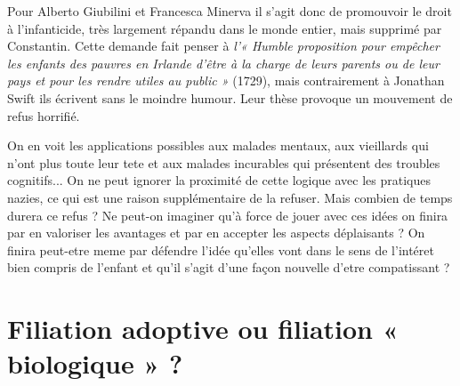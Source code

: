  Pour Alberto Giubilini et Francesca Minerva  il  s'agit donc de promouvoir le droit à l'infanticide, très largement répandu dans le monde entier, mais supprimé par Constantin. Cette demande fait penser à \emph{l'« Humble proposition pour empêcher les enfants des pauvres en Irlande d'être à la charge de leurs parents ou de leur pays et pour les rendre utiles au public »} (1729), mais contrairement à Jonathan Swift ils écrivent sans le moindre humour. Leur thèse provoque un mouvement de refus horrifié. 
 
 On en voit les applications possibles aux malades mentaux, aux vieillards qui n'ont plus toute leur tete et aux malades incurables qui présentent des troubles cognitifs... On ne peut ignorer la proximité de cette logique avec les pratiques nazies, ce qui est une raison supplémentaire de la refuser. Mais combien de temps durera ce refus ? Ne peut-on imaginer qu'à force de jouer avec ces idées on finira par en valoriser les avantages et par en accepter les aspects déplaisants  ? On finira peut-etre meme par défendre l'idée qu'elles vont dans le sens de l'intéret bien compris de l'enfant et qu'il s'agit d'une façon nouvelle d'etre compatissant ? 

 \section{Filiation adoptive ou filiation « biologique » ?} 
 
